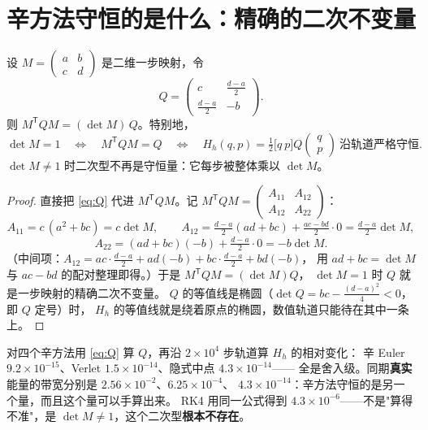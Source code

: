 \section{辛方法守恒的是什么：精确的二次不变量}
\label{sec:quad}

\begin{theorem}[二次不变量的存在性与闭式]
\label{thm:quad}
设 $M=\begin{pmatrix}a&b\\c&d\end{pmatrix}$ 是二维一步映射，令
\begin{equation}
  Q=\begin{pmatrix}c&\frac{d-a}{2}\\[2pt]\frac{d-a}{2}&-b\end{pmatrix}.
  \label{eq:Q}
\end{equation}
则 $M^{\mathsf T}QM=(\det M)\,Q$。特别地，
\[
  \det M=1\quad\Longleftrightarrow\quad M^{\mathsf T}QM=Q
  \quad\Longleftrightarrow\quad H_h(q,p)=\tfrac12\bigl[q\ p\bigr]Q\begin{pmatrix}q\\p\end{pmatrix}
  \ \text{沿轨道严格守恒}.
\]
$\det M\ne1$ 时二次型不再是守恒量：它每步被整体乘以 $\det M$。
\end{theorem}

\begin{proof}
直接把 \eqref{eq:Q} 代进 $M^{\mathsf T}QM$。记 $M^{\mathsf T}QM=\begin{pmatrix}A_{11}&A_{12}\\A_{12}&A_{22}\end{pmatrix}$：
\[
A_{11}=c\,(a^2+bc)=c\det M,\qquad
A_{12}=\tfrac{d-a}{2}(ad+bc)+\tfrac{ac-bd}{2}\cdot 0=\tfrac{d-a}{2}\det M,
\]
\[
A_{22}=(ad+bc)(-b)+\tfrac{d-a}{2}\cdot 0=-b\det M .
\]
（中间项：$A_{12}=ac\cdot\tfrac{d-a}{2}+ad(-b)+bc\cdot\tfrac{d-a}{2}+bd(-b)$，
用 $ad+bc=\det M$ 与 $ac-bd$ 的配对整理即得。）于是 $M^{\mathsf T}QM=(\det M)Q$，
$\det M=1$ 时 $Q$ 就是一步映射的精确二次不变量。
$Q$ 的等值线是椭圆（$\det Q=b c-\tfrac{(d-a)^2}{4}<0$，即 $Q$ 定号）时，
$H_h$ 的等值线就是绕着原点的椭圆，数值轨道只能待在其中一条上。
\end{proof}

\begin{corollary}[实测：把 $H_h$ 算出来]
\label{cor:hhexp}
对四个辛方法用 \eqref{eq:Q} 算 $Q$，再沿 $2\times10^4$ 步轨道算
$H_h$ 的相对变化：
辛 Euler $9.2\times10^{-15}$、Verlet $1.5\times10^{-14}$、隐式中点 $4.3\times10^{-14}$——
全是舍入级。同期\textbf{真实}能量的带宽分别是 $2.56\times10^{-2}$、$6.25\times10^{-4}$、
$4.3\times10^{-14}$：辛方法守恒的是另一个量，而且这个量可以手算出来。
RK4 用同一公式得到 $4.3\times10^{-6}$——不是"算得不准"，是
$\det M\ne1$，这个二次型\textbf{根本不存在}。
\end{corollary}

